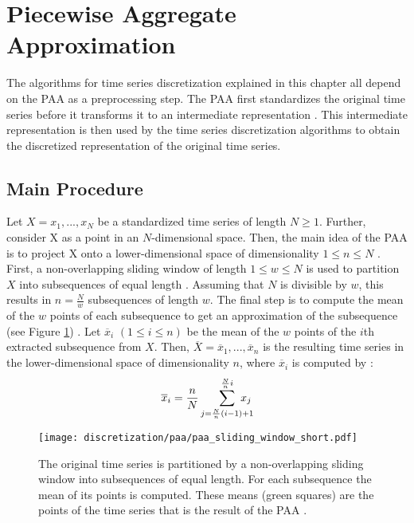 \section{Piecewise Aggregate Approximation}
The algorithms for time series discretization explained in this chapter all depend on the \ac{PAA} as a preprocessing step. The \ac{PAA} first standardizes the original time series before it transforms it to an intermediate representation \cite{PAA_Keogh}. This intermediate representation is then used by the time series discretization algorithms to obtain the discretized representation of the original time series. \newline
\subsection*{Main Procedure}
Let $X = x_1, ..., x_N$ be a standardized time series of length $N \geq 1$. Further, consider X as a point in an $N$-dimensional space. Then, the main idea of the \ac{PAA} is to project X onto a lower-dimensional space of dimensionality $1 \leq n \leq N$ \cite{PAA_Keogh}. \newline
First, a non-overlapping sliding window of length $1 \leq w \leq N$ is used to partition $X$ into subsequences of equal length \cite{PAA_Keogh}. Assuming that $N$ is divisible by $w$, this results in $n = \frac{N}{w}$ subsequences of length $w$. The final step is to compute the mean of the $w$ points of each subsequence to get an approximation of the subsequence (see Figure \ref{fig:PAA}) \cite{PAA_Yi_Faloutsos}. \newline
Let $\overline{x}_i$ $(1 \leq i \leq n)$ be the mean of the $w$ points of the $i$th extracted subsequence from $X$. Then, $\overline{X} = \overline{x}_1, ..., \overline{x}_n$ is the resulting time series in the lower-dimensional space of dimensionality $n$, where $\overline{x}_i$ is computed by \cite{PAA_Keogh}:
\begin{equation}
\overline{x}_i = \frac{n}{N} \sum_{j=\frac{N}{n}(i-1)+1}^{\frac{N}{n}i}\mkern-24mu x_j
\end{equation}
\begin{figure}[htb]
\centering
\texttt{[image: discretization/paa/paa\_sliding\_window\_short.pdf]}
\caption[Piecewise Aggregate Approximation - Sliding Window]{The original time series is partitioned by a non-overlapping sliding window into subsequences of equal length. For each subsequence the mean of its points is computed. These means (green squares) are the points of the time series that is the result of the \ac{PAA} \cite{PAA_Keogh}.} 
\label{fig:PAA}
\end{figure}
